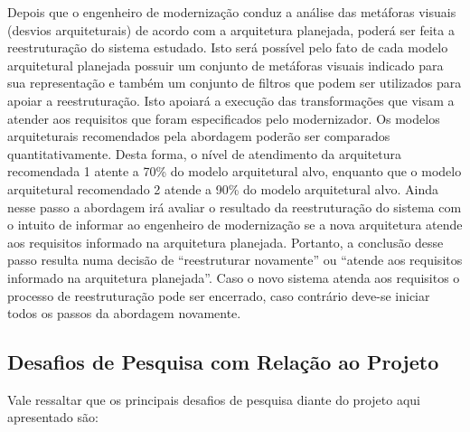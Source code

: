 \documentclass[12pt]{article}
\begin{document}
Depois que o engenheiro de modernização conduz a análise das metáforas visuais (desvios arquiteturais) de acordo com a arquitetura planejada, poderá ser feita a reestruturação do sistema estudado. Isto será possível pelo fato de cada modelo arquitetural planejada possuir um conjunto de metáforas visuais indicado para sua representação e também um conjunto de filtros que podem ser utilizados para apoiar a reestruturação. Isto apoiará a execução das transformações que visam a atender aos requisitos que foram especificados pelo modernizador. Os modelos arquiteturais recomendados pela abordagem poderão ser comparados quantitativamente. Desta forma, o nível de atendimento da arquitetura recomendada 1 atente a 70\% do modelo arquitetural alvo, enquanto que o modelo arquitetural recomendado 2 atende a 90\% do modelo arquitetural alvo. Ainda nesse passo a abordagem irá avaliar o resultado da reestruturação do sistema com o intuito de informar ao engenheiro de modernização se a nova arquitetura atende aos requisitos informado na arquitetura planejada. Portanto, a conclusão desse passo resulta numa decisão de ``reestruturar novamente'' ou ``atende aos requisitos informado na arquitetura planejada''. Caso o novo sistema atenda aos requisitos o processo de reestruturação pode ser encerrado, caso contrário deve-se iniciar todos os passos da abordagem novamente.


\subsection{Desafios de Pesquisa com Relação ao Projeto}

Vale ressaltar que os principais desafios de pesquisa diante do projeto aqui apresentado são:
\end{document}
